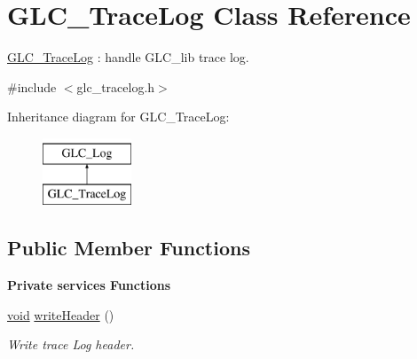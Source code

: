 \hypertarget{class_g_l_c___trace_log}{\section{G\-L\-C\-\_\-\-Trace\-Log Class Reference}
\label{class_g_l_c___trace_log}
}


\hyperlink{class_g_l_c___trace_log}{G\-L\-C\-\_\-\-Trace\-Log} \-: handle G\-L\-C\-\_\-lib trace log.  




{\ttfamily \#include $<$glc\-\_\-tracelog.\-h$>$}

Inheritance diagram for G\-L\-C\-\_\-\-Trace\-Log\-:\begin{figure}[H]
\begin{center}
\leavevmode
\includegraphics[height=2.000000cm]{class_g_l_c___trace_log}
\end{center}
\end{figure}
\subsection*{Public Member Functions}
\begin{Indent}{\bf Private services Functions}\par
\begin{DoxyCompactItemize}
\item 
\hyperlink{group___u_a_v_objects_plugin_ga444cf2ff3f0ecbe028adce838d373f5c}{void} \hyperlink{class_g_l_c___trace_log_a057f5ed9d5ed2c5bc4597971806c596c}{write\-Header} ()
\begin{DoxyCompactList}\small\item\em Write trace Log header. \end{DoxyCompactList}\end{DoxyCompactItemize}
\end{Indent}
